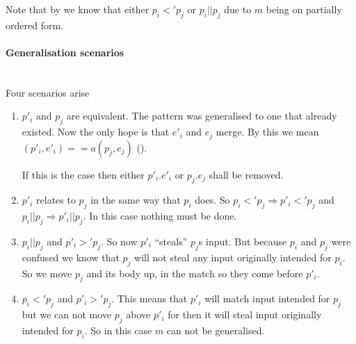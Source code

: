 Note that by  we know that either $p_i <' p_j$ or $p_i ||
p_j$ due to $m$ being on partially ordered form.

\paragraph{Generalisation scenarios} \ \\
Four scenarios arise
\begin{enumerate}
\item $p'_i$ and $p_j$ are equivalent. The pattern was generalised to one that
  already existed. Now the only hope is that $e'_i$ and $e_j$ merge. By this we
  mean $(p'_i, e'_i) ==a (p_j, e_j)$ ().

  If this is the case then either $p'_i \texttt{.} e'_i$ or $p_j \texttt{.} e_j$
  shall be removed. \label{item:gen-scen-1}
\item $p'_i$ relates to $p_j$ in the same way that $p_i$ does. So $p_i <' p_j
  \Rightarrow p'_i <' p_j$ and $p_i || p_j \Rightarrow p'_i || p_j$. In this
  case nothing must be done. \label{item:gen-scen-2}
\item $p_i || p_j$ and $p'_i >' p_j$. So now $p'_i$ ``steals'' $p_j$s input. But
  because $p_i$ and $p_j$ were confused we know that $p_j$ will not steal any
  input originally intended for $p_i$. So we move $p_j$ and its body up, in the
  match so they come before $p'_i$. \label{item:gen-scen-3}
\item $p_i <' p_j$ and $p'_i >' p_j$. This means that $p'_i$ will match input
  intended for $p_j$ but we can not move $p_j$ above $p'_i$ for then it will
  steal input originally intended for $p_i$. So in this case $m$ can not be
  generalised. \label{item:gen-scen-4}
\end{enumerate}

